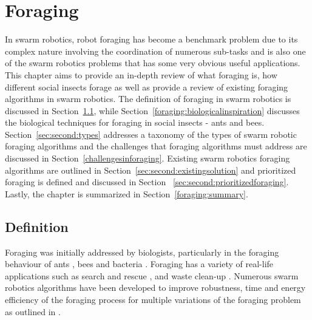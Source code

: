 
\chapter{Foraging}
\label{chap:second}


In swarm robotics, robot foraging has become a benchmark problem due to its complex nature involving the coordination of numerous sub-tasks and is also one of the swarm robotics problems that has some very obvious useful applications. This chapter aims to provide an in-depth review of what foraging is, how different social insects forage as well as provide a review of existing foraging algorithms in swarm robotics. The definition of foraging in swarm robotics is discussed in Section~\ref{sec:second:definition}, while Section~\ref{foraging:biologicalinspiration} discusses the biological techniques for foraging in social insects - ants and bees. Section~\ref{sec:second:types} addresses a taxonomy of the types of swarm robotic foraging algorithms and the challenges that foraging algorithms must address are discussed in Section~\ref{challengesinforaging}. Existing swarm robotics foraging algorithms are outlined in Section~\ref{sec:second:existingsolution} and prioritized foraging is defined and discussed in Section~
\ref{sec:second:prioritizedforaging}. Lastly, the chapter is summarized in Section~\ref{foraging:summary}. 



\section{Definition}
\label{sec:second:definition}

Foraging was initially addressed by biologists, particularly in the foraging behaviour of ants \cite{holldobler1990ants,bernstein1974seasonal}, bees \cite{seeley2009wisdom} and bacteria \cite{resnick1994turtles}. Foraging has a variety of real-life applications such as search and rescue \cite{jennings1997cooperative,murphy2000biomimetic}, and waste clean-up \cite{balch1995io}. Numerous swarm robotics algorithms have been developed to improve robustness, time and energy efficiency of the foraging process for multiple variations of the foraging problem as outlined in \cite{winfield2009foraging}. 

